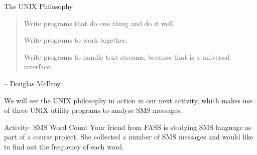 

\begin{frame}{The UNIX Philosophy}
\begin{quote}
Write programs that do one thing and do it well.

Write programs to work together.

Write programs to handle text streams, because that is a universal interface.
\end{quote}
\begin{flushright}
-- Douglas McIlroy
\end{flushright}
\end{frame}


We will see the UNIX philosophy in action in our next activity, which makes use
of three UNIX utility programs to analyse SMS messages.  

\begin{frame}{Activity: SMS Word Count}
Your friend from FASS is studying SMS language as part of a course project. She
collected a number of SMS messages and would like to find out the frequency of
each word. 
\end{frame}

